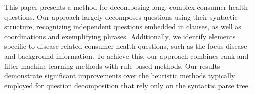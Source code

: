 This paper presents a method for decomposing long, complex consumer health questions.  Our approach largely decomposes questions using their syntactic structure, recognizing independent questions embedded in clauses, as well as coordinations and exemplifying phrases.  Additionally, we identify elements specific to disease-related consumer health questions, such as the focus disease and background information.  To achieve this, our approach combines rank-and-filter machine learning methods with rule-based methods.  Our results demonstrate significant improvements over the heuristic methods typically employed for question decomposition that rely only on the syntactic parse tree.
